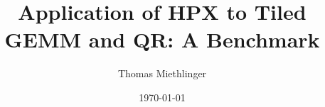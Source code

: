 
\title{Application of HPX to Tiled GEMM and QR: A Benchmark}

\author{Thomas Miethlinger}
\date{\today}

\maketitle
